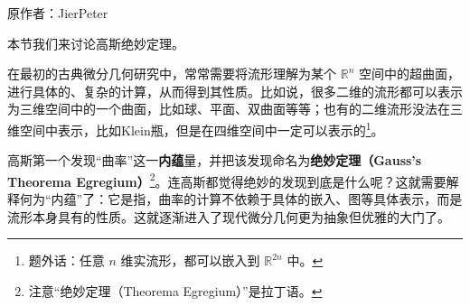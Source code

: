 
\begin{issues}
\issueDraft
\issueTODO
\end{issues}

原作者：JierPeter

本节我们来讨论高斯绝妙定理。

在最初的古典微分几何研究中，常常需要将流形理解为某个 $\mathbb{R}^n$ 空间中的超曲面，进行具体的、复杂的计算，从而得到其性质。比如说，很多二维的流形都可以表示为三维空间中的一个曲面，比如球、平面、双曲面等等；也有的二维流形没法在三维空间中表示，比如Klein瓶，但是在四维空间中一定可以表示的\footnote{题外话：任意 $n$ 维实流形，都可以嵌入到 $\mathbb{R}^{2n}$ 中。}。

高斯第一个发现“曲率”这一\textbf{内蕴}量，并把该发现命名为\textbf{绝妙定理（Gauss's Theorema Egregium）}\footnote{注意“绝妙定理（Theorema Egregium）”是拉丁语。}。连高斯都觉得绝妙的发现到底是什么呢？这就需要解释何为“内蕴”了：它是指，曲率的计算不依赖于具体的嵌入、图等具体表示，而是流形本身具有的性质。这就逐渐进入了现代微分几何更为抽象但优雅的大门了。
